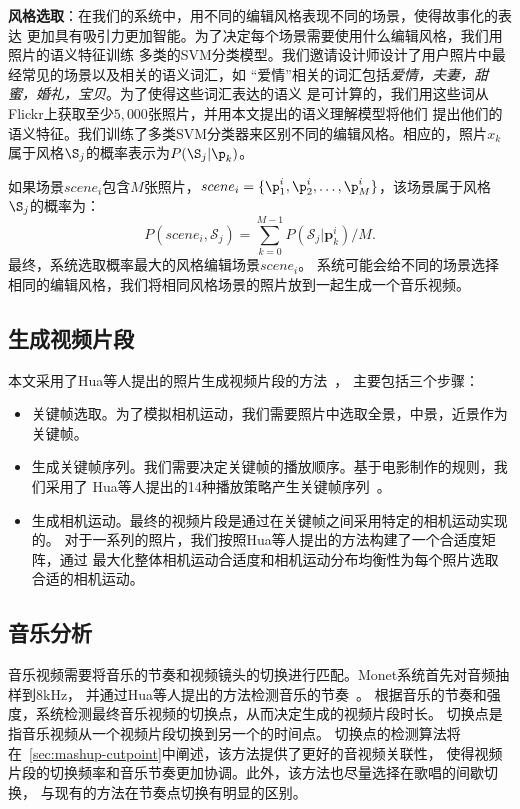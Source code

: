 \textbf{风格选取}：在我们的系统中，用不同的编辑风格表现不同的场景，使得故事化的表达
更加具有吸引力更加智能。为了决定每个场景需要使用什么编辑风格，我们用照片的语义特征训练
多类的SVM分类模型。我们邀请设计师设计了用户照片中最经常见的场景以及相关的语义词汇，如
``爱情''相关的词汇包括\emph{爱情，夫妻，甜蜜，婚礼，宝贝}。为了使得这些词汇表达的语义
是可计算的，我们用这些词从Flickr上获取至少$5,000$张照片，并用本文提出的语义理解模型将他们
提出他们的语义特征。我们训练了多类SVM分类器来区别不同的编辑风格。相应的，照片$x_k$
属于风格$\S_j$的概率表示为$P(\S_j|\p_k)$。

如果场景$scene_i$包含$M$张照片，$scene_i = \{\p_1^i, \p_2^i, \ldots,
\p_M^i\}$，该场景属于风格$\S_j$的概率为：
\begin{equation}
    P(scene_i, \mathcal{S}_j)= \sum_{k=0}^{M-1} P(\mathcal{S}_j|\textbf{p}_k^i) / M.
\end{equation}
最终，系统选取概率最大的风格编辑场景$scene_i$。
系统可能会给不同的场景选择相同的编辑风格，我们将相同风格场景的照片放到一起生成一个音乐视频。

\subsection{生成视频片段}
本文采用了Hua等人提出的照片生成视频片段的方法~\cite{hua2006photo2video}，
主要包括三个步骤：
\begin{itemize}
    \item 关键帧选取。为了模拟相机运动，我们需要照片中选取全景，中景，近景作为关键帧。
    \item 生成关键帧序列。我们需要决定关键帧的播放顺序。基于电影制作的规则，我们采用了
        Hua等人提出的14种播放策略产生关键帧序列~\cite{hua2006photo2video}。
    \item 生成相机运动。最终的视频片段是通过在关键帧之间采用特定的相机运动实现的。
        对于一系列的照片，我们按照Hua等人提出的方法构建了一个合适度矩阵，通过
        最大化整体相机运动合适度和相机运动分布均衡性为每个照片选取合适的相机运动。
\end{itemize}

\subsection{音乐分析}
音乐视频需要将音乐的节奏和视频镜头的切换进行匹配。Monet系统首先对音频抽样到8kHz，
并通过Hua等人提出的方法检测音乐的节奏~\cite{hua2006photo2video}。
根据音乐的节奏和强度，系统检测最终音乐视频的切换点，从而决定生成的视频片段时长。
切换点是指音乐视频从一个视频片段切换到另一个的时间点。
切换点的检测算法将在~\ref{sec:mashup-cutpoint}中阐述，该方法提供了更好的音视频关联性，
使得视频片段的切换频率和音乐节奏更加协调。此外，该方法也尽量选择在歌唱的间歇切换，
与现有的方法在节奏点切换有明显的区别。

